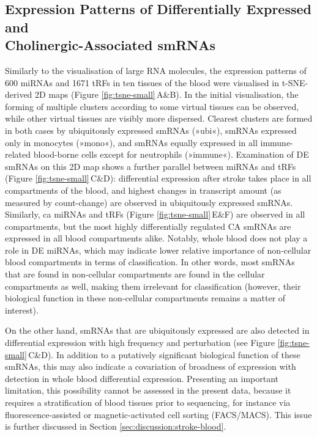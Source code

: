 \subsection{Expression Patterns of Differentially Expressed and\\ Cholinergic-Associated smRNAs}
Similarly to the visualisation of large RNA molecules, the expression patterns of 600 miRNAs and 1671 tRFs in ten tissues of the blood were visualised in t-SNE-derived 2D maps (Figure \ref{fig:tsne-small}\,A\&B). In the initial visualisation, the forming of multiple clusters according to some virtual tissues can be observed, while other virtual tissues are visibly more dispersed. Clearest clusters are formed in both cases by ubiquitously expressed smRNAs (»ubi«), smRNAs expressed only in monocytes (»mono«), and smRNAs equally expressed in all immune-related blood-borne cells except for neutrophils (»immune«). Examination of DE smRNAs on this 2D map shows a further parallel between miRNAs and tRFs (Figure \ref{fig:tsne-small}\,C\&D): differential expression after stroke takes place in all compartments of the blood, and highest changes in transcript amount (as measured by count-change) are observed in ubiquitously expressed smRNAs. Similarly, \acf{ca} miRNAs and tRFs (Figure \ref{fig:tsne-small}\,E\&F) are observed in all compartments, but the most highly differentially regulated CA smRNAs are expressed in all blood compartments alike. Notably, whole blood does not play a role in DE miRNAs, which may indicate lower relative importance of non-cellular blood compartments in terms of classification. In other words, most smRNAs that are found in non-cellular compartments are found in the cellular compartments as well, making them irrelevant for classification (however, their biological function in these non-cellular compartments remains a matter of interest).

On the other hand, smRNAs that are ubiquitously expressed are also detected in differential expression with high frequency and perturbation (see Figure \ref{fig:tsne-small}\,C\&D). In addition to a putatively significant biological function of these smRNAs, this may also indicate a covariation of broadness of expression with detection in whole blood differential expression. Presenting an important limitation, this possibility cannot be assessed in the present data, because it requires a stratification of blood tissues prior to sequencing, for instance via fluorescence-assisted or magnetic-activated cell sorting (FACS/MACS). This issue is further discussed in Section \ref{sec:discussion:stroke-blood}.


